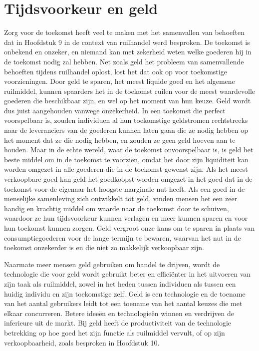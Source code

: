 \documentclass[
  a5paper,
  smalldemyvopaper,11pt,twoside,onecolumn,openright,extrafontsizes,
hidelinks]{memoir}
\begin{document}
\section{Tijdsvoorkeur en geld}\label{tijdsvoorkeur-en-geld}

Zorg voor de toekomst heeft veel te maken met het samenvallen van
behoeften dat in Hoofdstuk 9 in de context van ruilhandel werd
besproken. De toekomst is onbekend en onzeker, en niemand kan met
zekerheid weten welke goederen hij in de toekomst nodig zal hebben. Net
zoals geld het probleem van samenvallende behoeften tijdens ruilhandel
oplost, lost het dat ook op voor toekomstige voorzieningen. Door geld te
sparen, het meest liquide goed en het algemene ruilmiddel, kunnen
spaarders het in de toekomst ruilen voor de meest waardevolle goederen
die beschikbaar zijn, en wel op het moment van hun keuze. Geld wordt dus
juist aangehouden vanwege onzekerheid. In een toekomst die perfect
voorspelbaar is, zouden individuen al hun toekomstige geldstromen
rechtstreeks naar de leveranciers van de goederen kunnen laten gaan die
ze nodig hebben op het moment dat ze die nodig hebben, en zouden ze geen
geld hoeven aan te houden. Maar in de echte wereld, waar de toekomst
onvoorspelbaar is, is geld het beste middel om in de toekomst te
voorzien, omdat het door zijn liquiditeit kan worden omgezet in alle
goederen die in de toekomst gewenst zijn. Als het meest verkoopbare goed
kan geld het goedkoopst worden omgezet in het goed dat in de toekomst
voor de eigenaar het hoogste marginale nut heeft. Als een goed in de
menselijke samenleving zich ontwikkelt tot geld, vinden mensen het een
zeer handig en krachtig middel om waarde naar de toekomst door te
schuiven, waardoor ze hun tijdsvoorkeur kunnen verlagen en meer kunnen
sparen en voor hun toekomst kunnen zorgen. Geld vergroot onze kans om te
sparen in plaats van consumptiegoederen voor de lange termijn te
bewaren, waarvan het nut in de toekomst onzekerder is en die niet zo
makkelijk verkoopbaar zijn.

Naarmate meer mensen geld gebruiken om handel te drijven, wordt de
technologie die voor geld wordt gebruikt beter en efficiënter in het
uitvoeren van zijn taak als ruilmiddel, zowel in het heden tussen
individuen als tussen een huidig individu en zijn toekomstige zelf. Geld
is een technologie en de toename van het aantal gebruikers leidt tot een
toename van het aantal keuzes die met elkaar concurreren. Betere ideeën
en technologieën winnen en verdrijven de inferieure uit de markt. Bij
geld heeft de productiviteit van de technologie betrekking op hoe goed
het zijn functie als ruilmiddel vervult, of op zijn verkoopbaarheid,
zoals besproken in Hoofdstuk 10.
\end{document}
